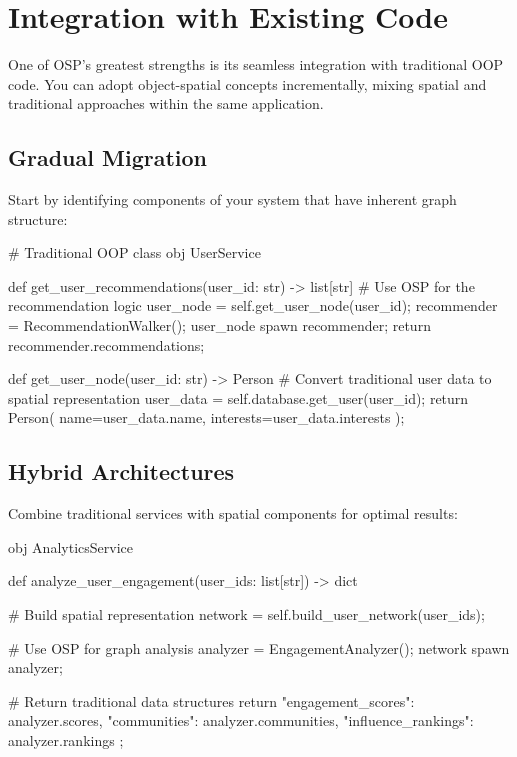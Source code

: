 \section{Integration with Existing Code}

One of OSP's greatest strengths is its seamless integration with traditional OOP code. You can adopt object-spatial concepts incrementally, mixing spatial and traditional approaches within the same application.

\subsection{Gradual Migration}

Start by identifying components of your system that have inherent graph structure:

\begin{jacblock}
# Traditional OOP class
obj UserService {
    def get_user_recommendations(user_id: str) -> list[str] {
        # Use OSP for the recommendation logic
        user_node = self.get_user_node(user_id);
        recommender = RecommendationWalker();
        user_node spawn recommender;
        return recommender.recommendations;
    }

    def get_user_node(user_id: str) -> Person {
        # Convert traditional user data to spatial representation
        user_data = self.database.get_user(user_id);
        return Person(
            name=user_data.name,
            interests=user_data.interests
        );
    }
}
\end{jacblock}

\subsection{Hybrid Architectures}

Combine traditional services with spatial components for optimal results:

\begin{jacblock}
obj AnalyticsService {
    def analyze_user_engagement(user_ids: list[str]) -> dict {
        # Build spatial representation
        network = self.build_user_network(user_ids);

        # Use OSP for graph analysis
        analyzer = EngagementAnalyzer();
        network spawn analyzer;

        # Return traditional data structures
        return {
            "engagement_scores": analyzer.scores,
            "communities": analyzer.communities,
            "influence_rankings": analyzer.rankings
        };
    }
}
\end{jacblock}


